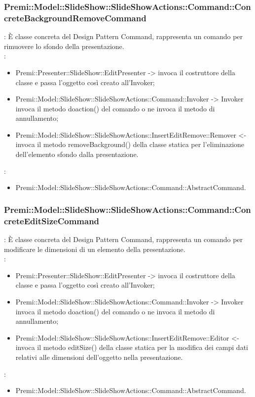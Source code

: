 {                    \subsubsection{Premi::Model::SlideShow::SlideShowActions::Command::ConcreteBackgroundRemoveCommand}{
				\textbf{\tipo}: È classe concreta del Design Pattern Command, rappresenta un comando per rimuovere lo sfondo della presentazione.\\	
				\textbf{\relaz}: 
				\begin{itemize}
					\item Premi::Presenter::SlideShow::EditPresenter -> invoca il costruttore della classe e passa l’oggetto così creato all’Invoker;
					\item Premi::Model::SlideShow::SlideShowActions::Command::Invoker -> Invoker invoca il metodo doaction() del comando o ne invoca il metodo di annullamento;
                    \item Premi::Model::SlideShow::SlideShowActions::InsertEditRemove::Remover <- invoca il metodo removeBackground() della classe statica per l’eliminazione dell'elemento sfondo dalla presentazione.
				\end{itemize}	
                \textbf{\base}: 
                    \begin{itemize}
                    \item Premi::Model::SlideShow::SlideShowActions::Command::AbstractCommand.
                    \end{itemize}
                    }
                        \subsubsection{Premi::Model::SlideShow::SlideShowActions::Command::ConcreteEditSizeCommand}{
				\textbf{\tipo}: È classe concreta del Design Pattern Command, rappresenta un comando per modificare le dimensioni di un elemento della presentazione.\\	
				\textbf{\relaz}: 
				\begin{itemize}
					\item Premi::Presenter::SlideShow::EditPresenter -> invoca il costruttore della classe e passa l’oggetto così creato all’Invoker;
					\item Premi::Model::SlideShow::SlideShowActions::Command::Invoker -> Invoker invoca il metodo doaction() del comando o ne invoca il metodo di annullamento;
                    \item Premi::Model::SlideShow::SlideShowActions::InsertEditRemove::Editor <- invoca il metodo editSize() della classe statica per la modifica dei campi dati relativi alle dimensioni dell'oggetto nella presentazione.
				\end{itemize}	
                \textbf{\base}: 
                    \begin{itemize}
                    \item Premi::Model::SlideShow::SlideShowActions::Command::AbstractCommand.
                    \end{itemize}
                    }
}
